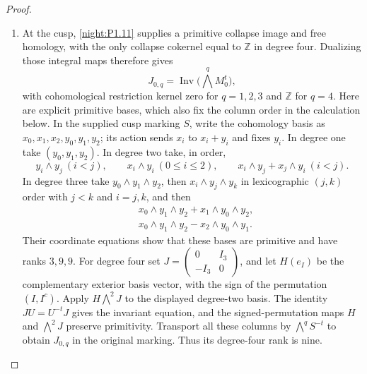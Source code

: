 \documentclass[11pt,a4paper]{article}
\theoremstyle{definition}
\begin{document}
\begin{proof}
\begin{enumerate}[label=\arabic*.]
We fix its column basis as follows.  Exterior coordinates are in
increasing lexicographic order, with indices starting at zero.
For each signed-permutation orbit, start at its least coordinate
and sum its successive signed images until it returns there.
A positive orbit of length $l$ gives a primitive invariant column;
the norm image has the column $m_i/l$ times that column.
A negative orbit has zero invariant lattice and one $\mathbb Z/2$
in its coinvariant group.  Indeed the successive relations identify
all its coordinates with signed copies of the first, and the last
relation is twice that first coordinate.  Order the positive orbits
by their least coordinates, with vertical columns before horizontal
columns.  For $D_1$ there is no torsion in vertical degrees $1$ through
$4$.  For $D_2$ there is one negative orbit in each such degree; the
positive-orbit counts are $1,2,2,1$.

\item At the cusp, \cref{night:P1.11} supplies a primitive collapse
image and free homology, with the only collapse cokernel equal to
$\mathbb Z$ in degree four.  Dualizing those integral maps therefore
gives
\[
 J_{0,q}=\operatorname{Inv}\bigl(\bigwedge^q M_0^t\bigr),
\]
with cohomological restriction kernel zero for $q=1,2,3$ and
$\mathbb Z$ for $q=4$.
Here are explicit primitive bases, which also fix the column order
in the calculation below.  In the supplied cusp marking $S$, write
the cohomology basis as $x_0,x_1,x_2,y_0,y_1,y_2$; its action sends
$x_i$ to $x_i+y_i$ and fixes $y_i$.
In degree one take $(y_0,y_1,y_2)$.  In degree two take, in order,
\[
 y_i\wedge y_j\ (i<j),\qquad
 x_i\wedge y_i\ (0\le i\le2),\qquad
 x_i\wedge y_j+x_j\wedge y_i\ (i<j).
\]
In degree three take $y_0\wedge y_1\wedge y_2$, then
$x_i\wedge y_j\wedge y_k$ in lexicographic $(j,k)$ order with
$j<k$ and $i=j,k$, and then
\[
\begin{split}
 &x_0\wedge y_1\wedge y_2+x_1\wedge y_0\wedge y_2,\\
 &x_0\wedge y_1\wedge y_2-x_2\wedge y_0\wedge y_1.
\end{split}
\]
Their coordinate equations show that these bases are primitive and
have ranks $3,9,9$.  For degree four set
$J=\left(\begin{smallmatrix}0&I_3\\-I_3&0\end{smallmatrix}\right)$,
and let $H(e_I)$ be the complementary exterior basis vector, with
the sign of the permutation $(I,I^c)$.  Apply
$H\bigwedge^2J$ to the displayed degree-two basis.
The identity $JU=U^{-t}J$ gives the invariant equation, and the
signed-permutation maps $H$ and $\bigwedge^2J$ preserve primitivity.
Transport all these columns by $\bigwedge^qS^{-t}$ to obtain
$J_{0,q}$ in the original marking.  Thus its degree-four rank is nine.


\end{enumerate}
\end{proof}
\end{document}
